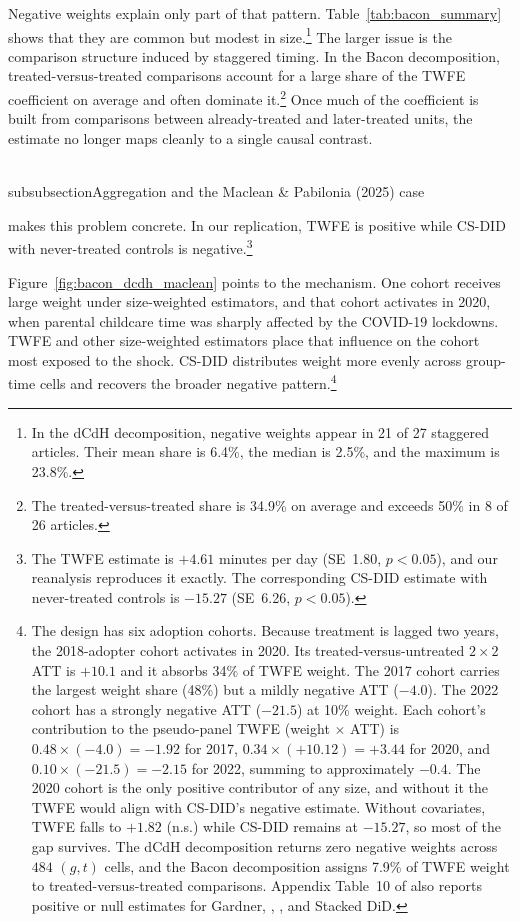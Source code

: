 \documentclass[11pt]{article}
\begin{document}
Negative weights explain only part of that pattern. Table~\ref{tab:bacon_summary} shows that they are common but modest in size.\footnote{In the dCdH decomposition, negative weights appear in 21 of 27 staggered articles. Their mean share is 6.4\%, the median is 2.5\%, and the maximum is 23.8\%.} The larger issue is the comparison structure induced by staggered timing. In the Bacon decomposition, treated-versus-treated comparisons account for a large share of the TWFE coefficient on average and often dominate it.\footnote{The treated-versus-treated share is 34.9\% on average and exceeds 50\% in 8 of 26 articles.} Once much of the coefficient is built from comparisons between already-treated and later-treated units, the estimate no longer maps cleanly to a single causal contrast.


\\subsubsection{Aggregation and the Maclean \& Pabilonia (2025) case}

\textcite{maclean2025paid} makes this problem concrete. In our replication, TWFE is positive while CS-DID with never-treated controls is negative.\footnote{The TWFE estimate is \(+4.61\) minutes per day (SE~1.80, \(p<0.05\)), and our reanalysis reproduces it exactly. The corresponding CS-DID estimate with never-treated controls is \(-15.27\) (SE~6.26, \(p<0.05\)).}

Figure~\ref{fig:bacon_dcdh_maclean} points to the mechanism. One cohort receives large weight under size-weighted estimators, and that cohort activates in 2020, when parental childcare time was sharply affected by the COVID-19 lockdowns. TWFE and other size-weighted estimators place that influence on the cohort most exposed to the shock. CS-DID distributes weight more evenly across group-time cells and recovers the broader negative pattern.\footnote{The design has six adoption cohorts. Because treatment is lagged two years, the 2018-adopter cohort activates in 2020. Its treated-versus-untreated \(2\times2\) ATT is \(+10.1\) and it absorbs 34\% of TWFE weight. The 2017 cohort carries the largest weight share (48\%) but a mildly negative ATT (\(-4.0\)). The 2022 cohort has a strongly negative ATT (\(-21.5\)) at 10\% weight. Each cohort's contribution to the pseudo-panel TWFE (weight \(\times\) ATT) is \(0.48\times(-4.0)=-1.92\) for 2017, \(0.34\times(+10.12)=+3.44\) for 2020, and \(0.10\times(-21.5)=-2.15\) for 2022, summing to approximately \(-0.4\). The 2020 cohort is the only positive contributor of any size, and without it the TWFE would align with CS-DID's negative estimate. Without covariates, TWFE falls to \(+1.82\) (n.s.) while CS-DID remains at \(-15.27\), so most of the gap survives. The dCdH decomposition returns zero negative weights across \(484\) \((g,t)\) cells, and the Bacon decomposition assigns 7.9\% of TWFE weight to treated-versus-treated comparisons. Appendix Table~10 of \textcite{maclean2025paid} also reports positive or null estimates for Gardner, \textcite{borusyak2024revisiting}, \textcite{wooldridge2025two}, and Stacked DiD.}
\end{document}
